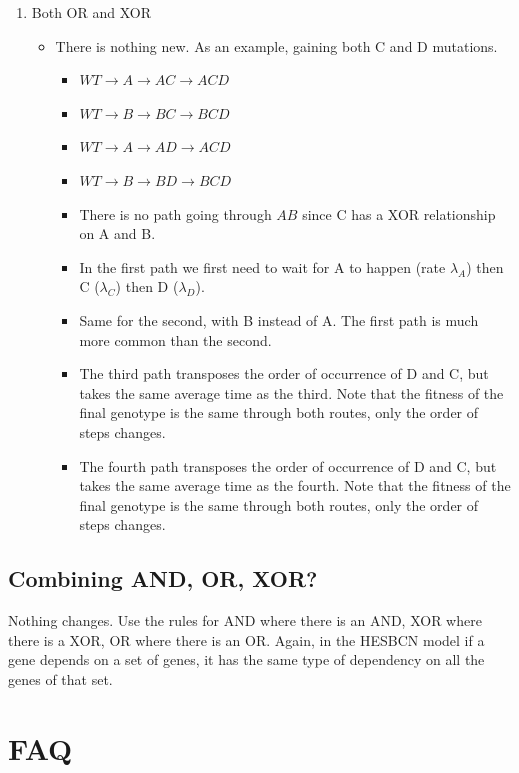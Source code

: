 \documentclass[a4paper,11pt]{article}
\begin{document}
\begin{enumerate}
\item Both OR and XOR
\label{sec:org5edd44b}
\begin{itemize}
\item There is nothing new. As an example, gaining both C and D mutations.
\begin{itemize}
\item \(WT \rightarrow A \rightarrow AC \rightarrow ACD\)
\item \(WT \rightarrow B \rightarrow BC \rightarrow BCD\)
\item \(WT \rightarrow A \rightarrow AD \rightarrow ACD\)
\item \(WT \rightarrow B \rightarrow BD \rightarrow BCD\)
\item There is no path going through \(AB\) since C has a XOR relationship on A and B.

\item In the first path we first need to wait for A to happen (rate \(\lambda_A\)) then C (\(\lambda_C\)) then D (\(\lambda_D\)).
\item Same for the second, with B instead of A. The first path is much more common than the second.
\item The third path transposes the order of occurrence of D and C, but takes the same average time as the third. Note that the fitness of the final genotype is the same through both routes, only the order of steps changes.
\item The fourth path transposes the order of occurrence of D and C, but takes the same average time as the fourth. Note that the fitness of the final genotype is the same through both routes, only the order of steps changes.
\end{itemize}
\end{itemize}
\end{enumerate}

\subsection{Combining AND, OR, XOR?}
\label{sec:org78cffb2}
Nothing changes. Use the rules for AND where there is an AND, XOR where there is a XOR, OR where there is an OR. Again, in the HESBCN model if a gene depends on a set of genes, it has the same type of dependency on all the genes of that set.

\clearpage



\section{FAQ}
\label{sec:faq}
\end{document}
